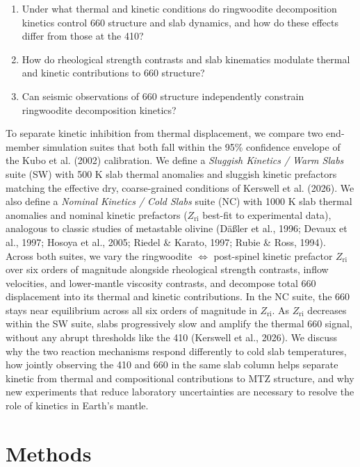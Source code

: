 \documentclass[draft,linenumbers]{agujournal2019}
\providecommand{\tightlist}{\setlength{\itemsep}{0pt}\setlength{\parskip}{0pt}}
\begin{document}
\begin{enumerate}
\def\labelenumi{\arabic{enumi}.}
\tightlist
\item
  Under what thermal and kinetic conditions do ringwoodite decomposition
  kinetics control 660 structure and slab dynamics, and how do these
  effects differ from those at the 410?
\item
  How do rheological strength contrasts and slab kinematics modulate
  thermal and kinetic contributions to 660 structure?
\item
  Can seismic observations of 660 structure independently constrain
  ringwoodite decomposition kinetics?
\end{enumerate}

To separate kinetic inhibition from thermal displacement, we compare two
end-member simulation suites that both fall within the 95\% confidence
envelope of the Kubo et al. (2002) calibration. We define a
\emph{Sluggish Kinetics / Warm Slabs} suite (SW) with 500 K slab thermal
anomalies and sluggish kinetic prefactors matching the effective dry,
coarse-grained conditions of Kerswell et al. (2026). We also define a
\emph{Nominal Kinetics / Cold Slabs} suite (NC) with 1000 K slab thermal
anomalies and nominal kinetic prefactors (\(Z_\mathrm{ri}\) best-fit to
experimental data), analogous to classic studies of metastable olivine
(Däßler et al., 1996; Devaux et al., 1997; Hosoya et al., 2005; Riedel
\& Karato, 1997; Rubie \& Ross, 1994). Across both suites, we vary the
ringwoodite \(\Leftrightarrow\) post-spinel kinetic prefactor
\(Z_\mathrm{ri}\) over six orders of magnitude alongside rheological
strength contrasts, inflow velocities, and lower-mantle viscosity
contrasts, and decompose total 660 displacement into its thermal and
kinetic contributions. In the NC suite, the 660 stays near equilibrium
across all six orders of magnitude in \(Z_\mathrm{ri}\). As
\(Z_\mathrm{ri}\) decreases within the SW suite, slabs progressively
slow and amplify the thermal 660 signal, without any abrupt thresholds
like the 410 (Kerswell et al., 2026). We discuss why the two reaction
mechanisms respond differently to cold slab temperatures, how jointly
observing the 410 and 660 in the same slab column helps separate kinetic
from thermal and compositional contributions to MTZ structure, and why
new experiments that reduce laboratory uncertainties are necessary to
resolve the role of kinetics in Earth's mantle.

\section{Methods}\label{sec:methods}
\end{document}
